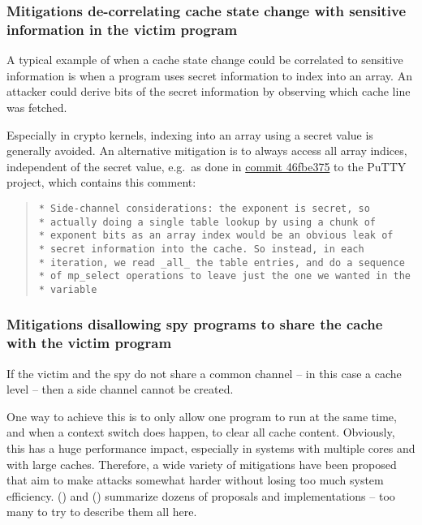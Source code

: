 \documentclass[
  a4paper,
]{report}
\begin{document}
\subsubsection{Mitigations de-correlating cache state change with
sensitive information in the victim
program}\label{mitigations-de-correlating-cache-state-change-with-sensitive-information-in-the-victim-program}

A typical example of when a cache state change could be correlated to
sensitive information is when a program uses secret information to index
into an array. An attacker could derive bits of the secret information
by observing which cache line was fetched.

Especially in crypto kernels, indexing into an array using a secret
value is generally avoided. An alternative mitigation is to always
access all array indices, independent of the secret value, e.g.~as done
in
\href{https://git.tartarus.org/?p=simon/putty.git;a=commitdiff;h=46fbe375bf}{commit
46fbe375} to the PuTTY project, which contains this comment:

\begin{quote}
\begin{verbatim}
* Side-channel considerations: the exponent is secret, so
* actually doing a single table lookup by using a chunk of
* exponent bits as an array index would be an obvious leak of
* secret information into the cache. So instead, in each
* iteration, we read _all_ the table entries, and do a sequence
* of mp_select operations to leave just the one we wanted in the
* variable
\end{verbatim}
\end{quote}

\subsubsection{Mitigations disallowing spy programs to share the cache
with the victim
program}\label{mitigations-disallowing-spy-programs-to-share-the-cache-with-the-victim-program}

If the victim and the spy do not share a common channel -- in this case
a cache level -- then a side channel cannot be created.

One way to achieve this is to only allow one program to run at the same
time, and when a context switch does happen, to clear all cache content.
Obviously, this has a huge performance impact, especially in systems
with multiple cores and with large caches. Therefore, a wide variety of
mitigations have been proposed that aim to make attacks somewhat harder
without losing too much system efficiency.
() and
() summarize dozens of proposals
and implementations -- too many to try to describe them all here.
\end{document}
